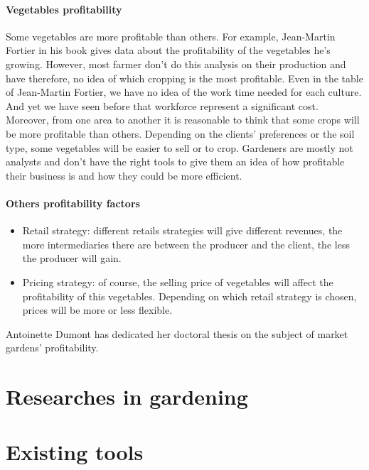 \paragraph{Vegetables profitability}
Some vegetables are more profitable than others. For example, Jean-Martin Fortier \cite{fortier} in his book gives data about the profitability of the vegetables he's growing. However, most farmer don't do this analysis on their production and have therefore, no idea of which cropping is the most profitable. Even in the table of Jean-Martin Fortier, we have no idea of the work time needed for each culture. And yet we have seen before that workforce represent a significant cost.
Moreover, from one area to another it is reasonable to think that some crops will be more profitable than others. Depending on the clients' preferences or the soil type, some vegetables will be easier to sell or to crop.
Gardeners are mostly not analysts and don't have the right tools to give them an idea of how profitable their business is and how they could be more efficient.

\paragraph{Others profitability factors}

\begin{itemize}
\item Retail strategy: different retails strategies will give different revenues, the more intermediaries there are between the producer and the client, the less the producer will gain.
\item Pricing strategy: of course, the selling price of vegetables will affect the profitability of this vegetables. Depending on which retail strategy is chosen, prices will be more or less flexible.
\end{itemize}

Antoinette Dumont has dedicated her doctoral thesis on the subject of market gardens' profitability.\cite{adumont}

\section{Researches in gardening}




\section{Existing tools}

